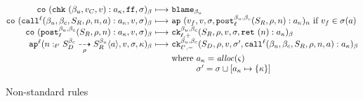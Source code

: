 \documentclass[preprint,onecolumn,9pt]{sigplanconf} %
\begin{document}
\begin{figure*}
\begin{gather*}
\begin{array}{@{}r@{\ }c@{\ }l@{}}
      \\
      \co{\spush{\kcheck{\mmlab_u, \mval_C, \mval}}{\mkaddr}, \sfalse, \msto}{\mmlab} &\machstep&
      \sblame{\mmlab_u}
      \\
      \co{\spush{\kmcall[^\mlab]{\mmlab_u, \mmlab_c, \mscon_R, \menv, \mname, \maddr}}{\mkaddr}, \mval, \msto}{\mmlab} &\machstep&
      \ap{\mval_f, \mval, \msto, \spush{\kpost[^{\mmlab_u, \mmlab_c}_\mlab]{\mscon_R, \menv, \mname}}{\mkaddr}}{\mname}
        \text{ if } \mval_f \in \msto(\maddr)
      \\
      \co{\spush{\kpost[^{\mmlab_u, \mmlab_c}_\mlab]{\mscon_R, \menv, \mname}}{\mkaddr}, \mval, \msto}{\mmlab} &\machstep&
      \ck{\mmlab_u}{\mmlab_c}{\mlab}{+}{\mscon_R, \menv, \mval, \msto, \spush{\krt{\mname}}{\mkaddr}}{\mmlab}
      \\
      \ap[^\mlab]{\blclos{\mname}{\mmlab_u}{\mmlab_c}{\mlab'}{\mscon_D}{\mscon_R}{\menv}{\maddr}, \mval, \msto, \mkont}{\mmlab} &\machstep&
      \ck{\mmlab_u}{\mmlab_c}{\mlab'}{-}{\mscon_D, \menv, \mval, \msto',
          \spush{\kmcall[^\mlab]{\mmlab_u, \mmlab_c, \mscon_R, \menv, \mname, \maddr}}{\mkaddr}}{\mmlab} \\
      &&\text{where } \mkaddr = \alloc(\mstate) \\
      &&\phantom{\text{where }} \msto' = \ext{\msto}{\mkaddr}{\setof{\mkont}}
    \end{array}
  \end{gather*}
  \caption{Non-standard rules}
\label{fig:concrete}
\end{figure*}
%
%
%

% 
\end{document}
